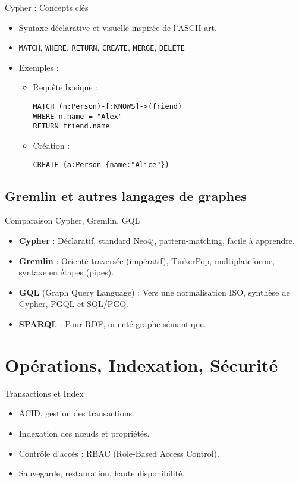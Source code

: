 \documentclass{beamer}
\begin{document}
\begin{frame}[fragile]{Cypher : Concepts clés}
  \begin{itemize}
    \item Syntaxe déclarative et visuelle inspirée de l’ASCII art.
    \item \texttt{MATCH}, \texttt{WHERE}, \texttt{RETURN}, \texttt{CREATE}, \texttt{MERGE}, \texttt{DELETE}
    \item Exemples :
      \begin{itemize}
        \item Requête basique :
\begin{lstlisting}
MATCH (n:Person)-[:KNOWS]->(friend)
WHERE n.name = "Alex"
RETURN friend.name
\end{lstlisting}
        \item Création :
\begin{lstlisting}
CREATE (a:Person {name:"Alice"})
\end{lstlisting}
      \end{itemize}
  \end{itemize}
\end{frame}

\subsection{Gremlin et autres langages de graphes}
\begin{frame}{Comparaison Cypher, Gremlin, GQL}
  \begin{itemize}
    \item \textbf{Cypher} : Déclaratif, standard Neo4j, pattern-matching, facile à apprendre.
    \item \textbf{Gremlin} : Orienté traversée (impératif), TinkerPop, multiplateforme, syntaxe en étapes (pipes).
    \item \textbf{GQL} (Graph Query Language) : Vers une normalisation ISO, synthèse de Cypher, PGQL et SQL/PGQ.
    \item \textbf{SPARQL} : Pour RDF, orienté graphe sémantique.
  \end{itemize}
\end{frame}

\section{Opérations, Indexation, Sécurité}
\begin{frame}{Transactions et Index}
  \begin{itemize}
    \item ACID, gestion des transactions.
    \item Indexation des nœuds et propriétés.
    \item Contrôle d’accès : RBAC (Role-Based Access Control).
    \item Sauvegarde, restauration, haute disponibilité.
  \end{itemize}
\end{frame}
\end{document}
